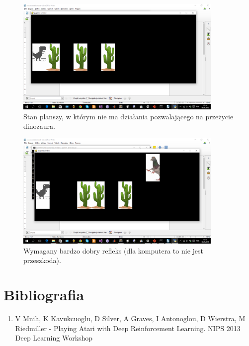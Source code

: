 \documentclass[11pt]{article} %
\begin{document}
\begin{figure}[h]
\centering
\includegraphics[width=10cm]{images/dinosaur_2}
\caption{Stan planszy, w którym nie ma działania pozwalającego na przeżycie dinozaura.} \label{fig:dinosaur_2}
\end{figure}

\begin{figure}[h]
\centering
\includegraphics[width=10cm]{images/dinosaur_3}
\caption{Wymagany bardzo dobry refleks (dla komputera to nie jest przeszkoda).} \label{fig:dinosaur_3}
\end{figure}

\section{Bibliografia}

\begin{enumerate}
\item V Mnih, K Kavukcuoglu, D Silver, A Graves, I Antonoglou, D Wierstra, M Riedmiller - Playing Atari with Deep Reinforcement Learning.  NIPS 2013 Deep Learning Workshop

\end{enumerate}
\end{document}
